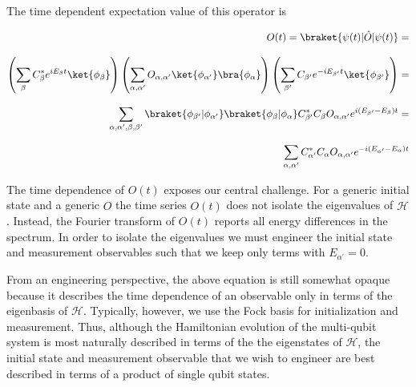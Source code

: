 \noindent The time dependent expectation value of this operator is

\begin{equation*}
    \label{derive_energy_differences}
    \begin{aligned}
        O(t) =\braket{\psi(t)|\hat{O}|\psi(t)} = \\[2.0ex]
        \left( \sum_{\beta} C^{*}_{\beta} e^{i E_{\beta} t} \ket{\phi_{\beta}} \right)
        \left( \sum_{\alpha,\alpha^{\prime}} O_{\alpha,\alpha^{\prime}} \ket{\phi_{\alpha^{\prime}}} \bra{\phi_{\alpha}} \right)
        \left( \sum_{\beta^{\prime}} C_{\beta^{\prime}} e^{- i E_{\beta^{\prime}} t} \ket{\phi_{\beta^{\prime}}} \right) = \\[2.0ex]
        \sum_{\alpha, \alpha^{\prime}, \beta, \beta^{\prime} }
        \braket{\phi_{\beta^{\prime}}|\phi_{\alpha^{\prime}}}
        \braket{\phi_{\beta}|\phi_{\alpha}}
        C_{\beta^{\prime}}^{*} C_{\beta} O_{\alpha, \alpha^{\prime}} e^{i (E_{\beta^\prime} - E_{\beta}) t} = \\[2.0ex]
        \sum_{\alpha, \alpha^{\prime}} C^{*}_{\alpha^{\prime}} C_{\alpha} O_{\alpha, \alpha^{\prime}} e^{- i (E_{\alpha^{\prime}} - E_{\alpha}) t}
    \end{aligned}
\end{equation*}

\noindent The time dependence of $O(t)$ exposes our central challenge.
For a generic initial state and a generic $\hat{O}$ the time series $O(t)$ does not isolate the eigenvalues of $\mathcal{H}$.
Instead, the Fourier transform of $O(t)$ reports all energy differences in the spectrum.
In order to isolate the eigenvalues we must engineer the initial state and measurement observables such that we keep only terms with $E_{\alpha^{\prime}}=0$.

From an engineering perspective,
the above equation is still somewhat opaque because it describes the time dependence of an observable only in terms of the eigenbasis of $\mathcal{H}$.
Typically, however, we use the Fock basis for initialization and measurement.
Thus, although the Hamiltonian evolution of the multi-qubit system is most naturally described in terms of the the eigenstates of $\mathcal{H}$,
the initial state and measurement observable that we wish to engineer are best described in terms of a product of single qubit states.

\begin{center}
\end{center}

